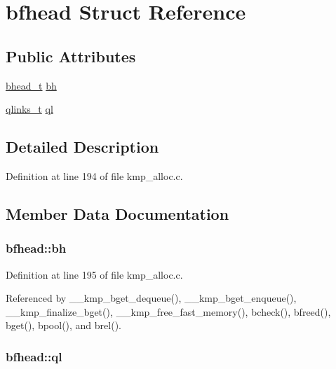 \hypertarget{structbfhead}{\section{bfhead Struct Reference}
\label{structbfhead}
}
\subsection*{Public Attributes}
\begin{DoxyCompactItemize}
\item 
\hyperlink{kmp__alloc_8c_af1de790fdc3ba84111ab8cd6730510bd}{bhead\-\_\-t} \hyperlink{structbfhead_a75547156d52c89826f1e0d711014f77a}{bh}
\item 
\hyperlink{kmp__alloc_8c_a9059958aafec0d30537fe432f36b6665}{qlinks\-\_\-t} \hyperlink{structbfhead_adc2c1c9fc5b4081009c158da12064bfe}{ql}
\end{DoxyCompactItemize}


\subsection{Detailed Description}


Definition at line 194 of file kmp\-\_\-alloc.\-c.



\subsection{Member Data Documentation}
\hypertarget{structbfhead_a75547156d52c89826f1e0d711014f77a}{
\subsubsection[{bh}]{ bfhead\-::bh}}\label{structbfhead_a75547156d52c89826f1e0d711014f77a}


Definition at line 195 of file kmp\-\_\-alloc.\-c.



Referenced by \-\_\-\-\_\-kmp\-\_\-bget\-\_\-dequeue(), \-\_\-\-\_\-kmp\-\_\-bget\-\_\-enqueue(), \-\_\-\-\_\-kmp\-\_\-finalize\-\_\-bget(), \-\_\-\-\_\-kmp\-\_\-free\-\_\-fast\-\_\-memory(), bcheck(), bfreed(), bget(), bpool(), and brel().

\hypertarget{structbfhead_adc2c1c9fc5b4081009c158da12064bfe}{
\subsubsection[{ql}]{ bfhead\-::ql}}\label{structbfhead_adc2c1c9fc5b4081009c158da12064bfe}


